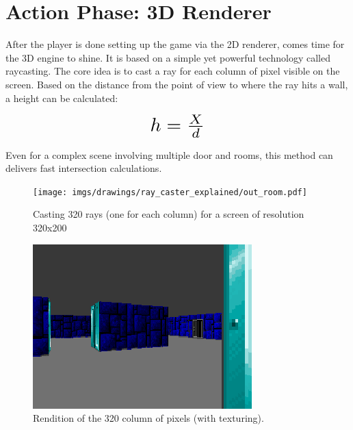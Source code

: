 \section{Action Phase: 3D Renderer}
After the player is done setting up the game via the 2D renderer, comes time for the 3D engine to shine. It is based on a simple yet powerful technology called raycasting. The core idea is to cast a ray for each column of pixel visible on the screen. Based on the distance  from the point of view to where the ray hits a wall, a height  can be calculated:\\
\par
\begin{figure}[H]
  \centering
  \begin{equation*}
      \scalebox{2.0}{$h = \frac{X}{d}$}
  \end{equation*}
\end{figure}
\par
Even for a complex scene involving multiple door and rooms, this method can delivers fast intersection calculations.
\par
\begin{figure}[H]
\centering
 \texttt{[image: imgs/drawings/ray\_caster\_explained/out\_room.pdf]}
 \caption{Casting 320 rays (one for each column) for a screen of resolution 320x200} \label{fig:Raycasting2}
\end{figure}

\begin{figure}[H]
  \centering
 \includegraphics[width=\textwidth]{imgs/drawings/ray_caster_explained/out_door.png}
 \caption{Rendition of the 320 column of pixels (with texturing).} 
\end{figure} 


